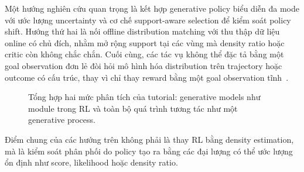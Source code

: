 Một hướng nghiên cứu quan trọng là kết hợp generative policy biểu diễn đa mode với ước lượng uncertainty và cơ chế support-aware selection để kiểm soát policy shift.
Hướng thứ hai là nối offline distribution matching với thu thập dữ liệu online có chủ đích, nhằm mở rộng support tại các vùng mà density ratio hoặc critic còn không chắc chắn.
Cuối cùng, các tác vụ không thể đặc tả bằng một goal observation đơn lẻ đòi hỏi mô hình hóa distribution trên trajectory hoặc outcome có cấu trúc, thay vì chỉ thay reward bằng một goal observation tĩnh~\cite{eysenbach2025generativerl}.
\begin{figure}[H]
    \centering
    \caption{Tổng hợp hai mức phân tích của tutorial: generative models như module trong RL và toàn bộ quá trình tương tác như một generative process.}
    \label{fig:tv2-part1-part2-synthesis}
\end{figure}

Điểm chung của các hướng trên không phải là thay RL bằng density estimation, mà là kiểm soát phân phối do policy tạo ra bằng các đại lượng có thể ước lượng ổn định như score, likelihood hoặc density ratio.
